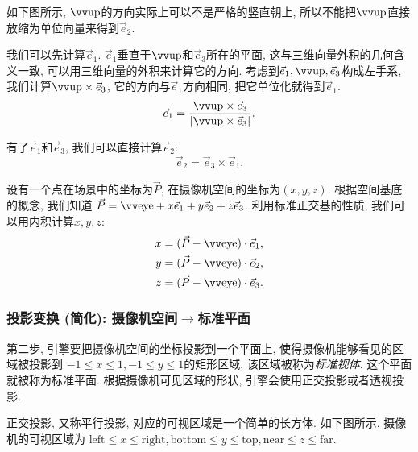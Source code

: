 如下图所示, $\up$的方向实际上可以不是严格的竖直朝上,
所以不能把$\up$直接放缩为单位向量来得到$\vec e_2$.

\begin{center}
\end{center}

我们可以先计算$\vec e_1$.
$\vec e_1$垂直于$\up$和$\vec e_3$所在的平面,
这与三维向量外积的几何含义一致,
可以用三维向量的外积来计算它的方向.
考虑到$\vec e_1,\up,\vec e_3$构成左手系,
我们计算$\up\times\vec e_3$, 它的方向与$\vec e_1$方向相同,
把它单位化就得到$\vec e_1$.
\[
  \vec e_1 = \dfrac{\up\times\vec e_3}{|\up\times\vec e_3|}.
\]

有了$\vec e_1$和$\vec e_3$, 我们可以直接计算$\vec e_2$:
\[
  \vec e_2 = \vec e_3\times\vec e_1.
\]

设有一个点在场景中的坐标为$\vec P$, 在摄像机空间的坐标为$(x,y,z)$.
根据空间基底的概念, 我们知道
$\vec P = \eye + x\vec e_1 + y\vec e_2 + z\vec e_3$.
利用标准正交基的性质, 我们可以用内积计算$x,y,z$:
\begin{align*}
  x = (\vec P - \eye)\cdot\vec e_1, \\
  y = (\vec P - \eye)\cdot\vec e_2, \\
  z = (\vec P - \eye)\cdot\vec e_3.
\end{align*}

\subsubsection{投影变换 (简化): 摄像机空间$\to$标准平面}

第二步, 引擎要把摄像机空间的坐标投影到一个平面上,
使得摄像机能够看见的区域被投影到
$-1\le x\le1,-1\le y\le1$的矩形区域, 该区域被称为\emph{标准视体}.
这个平面就被称为标准平面.
根据摄像机可见区域的形状, 引擎会使用正交投影或者透视投影.

正交投影, 又称平行投影, 对应的可视区域是一个简单的长方体.
如下图所示, 摄像机的可视区域为
$
  \text{left} \le x \le \text{right},
  \text{bottom} \le y \le \text{top},
  \text{near} \le z \le \text{far}.
$

